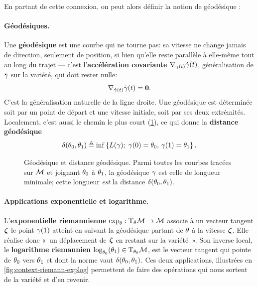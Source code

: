 En partant de cette connexion, on peut alors définir la notion de géodésique :

\paragraph{Géodésiques.} Une \textbf{géodésique} est une courbe qui ne tourne pas: sa vitesse ne change jamais de direction, seulement de position, si bien qu'elle reste parallèle à elle-même tout au long du trajet --- c'est l'\textbf{accélération covariante} $\nabla_{\dot{\gamma}(t)}\dot{\gamma}(t)$, généralisation de $\ddot{\gamma}$ sur la variété, qui doit rester nulle:
\begin{equation}
  \nabla_{\dot{\gamma}(t)}\dot{\gamma}(t) = \boldsymbol{0}.
  \label{eq:context-riemann-geodesique}
\end{equation}
C'est la généralisation naturelle de la ligne droite. Une géodésique est déterminée soit par un point de départ et une vitesse initiale, soit par ses deux extrémités. Localement, c'est aussi le chemin le plus court (\cref{fig:context-riemann-geodesique}), ce qui donne la \textbf{distance géodésique}
\begin{equation}
  \delta(\theta_0,\theta_1)
  \triangleq
  \inf\left\{ L(\gamma);\; \gamma(0)=\theta_0,\, \gamma(1)=\theta_1 \right\}.
  \label{eq:context-riemann-distance}
\end{equation}

\begin{figure}[htb]
  \centering
  
  \caption{Géodésique et distance géodésique. Parmi toutes les courbes tracées
    sur $\mathcal{M}$ et joignant $\theta_0$ à $\theta_1$, la géodésique $\gamma$
    est celle de longueur minimale; cette longueur \emph{est} la distance
    $\delta(\theta_0,\theta_1)$.}
  \label{fig:context-riemann-geodesique}
\end{figure}

\paragraph{Applications exponentielle et logarithme.} L'\textbf{exponentielle riemannienne} $\exp_\theta:\mathrm{T}_{\theta}\mathcal{M}\to\mathcal{M}$ associe à un vecteur tangent $\boldsymbol{\zeta}$ le point $\gamma(1)$ atteint en suivant la géodésique partant de $\theta$ à la vitesse $\boldsymbol{\zeta}$. Elle réalise donc «~un déplacement de $\boldsymbol{\zeta}$ en restant sur la variété~». Son inverse local, le \textbf{logarithme riemannien} $\log_{\theta_0}(\theta_1)\in\mathrm{T}_{\theta_0}\mathcal{M}$, est le vecteur tangent qui pointe de $\theta_0$ vers $\theta_1$ et dont la norme vaut $\delta(\theta_0,\theta_1)$. Ces deux applications, illustrées en \cref{fig:context-riemann-explog} permettent de faire des opérations qui nous sortent de la variété et d'en revenir.

